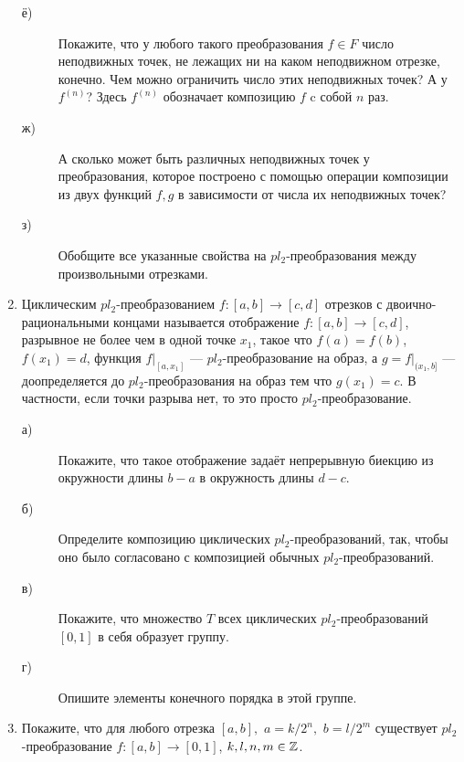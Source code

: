 \begin{enumerate}
\begin{description}
\item[ё)] Покажите, что у любого такого преобразования $f\in F$ число неподвижных точек, не лежащих ни на каком неподвижном отрезке, конечно. Чем можно ограничить число этих неподвижных точек? А у $f^{(n)}$?  Здесь $f^{(n)}$ обозначает композицию $f$ c собой $n$ раз.
\item[ж)] А сколько может быть различных неподвижных точек у преобразования, которое построено с помощью операции композиции из двух функций $f,g$ в зависимости от числа их неподвижных точек?
\item[з)] Обобщите все указанные свойства на $pl_2$-преобразования между произвольными отрезками.
\end{description}

\item Циклическим $pl_2$-преобразованием $f\colon[a,b]\to [c,d]$ отрезков с двоично-рациональными концами называется отображение $f\colon[a,b]\to [c,d]$, разрывное не более чем в одной точке $x_1$, такое что $f(a)=f(b)$, $f(x_1)=d$, функция $f|_{[a,x_1]}$ --- $pl_2$-преобразование на образ, а $g=f|_{(x_1,b]}$ --- доопределяется до $pl_2$-преобразования на образ тем что $g(x_1)=c$. В частности, если точки разрыва нет, то это просто $pl_2$-преобразование.
\begin{description}
\item[а)] Покажите, что такое отображение задаёт непрерывную биекцию из окружности длины $b-a$ в окружность длины $d-c$.
\item[б)] Определите композицию циклических $pl_2$-преобразований, так, чтобы оно было согласовано с композицией обычных $pl_2$-преобразований.
\item[в)] Покажите, что множество $T$ всех циклических $pl_2$-преобразований $[0,1]$ в себя образует группу.
\item[г)] Опишите элементы конечного порядка в этой группе.
\end{description}

\item Покажите, что для любого отрезка $[a,b], \,\, a=k/2^n,\,\, b=l/2^m$ существует $pl_2$-преобразование $f\colon [a,b]\to [0,1]$, $k, l, n, m \in\mathbb{Z}$.



\end{enumerate}
